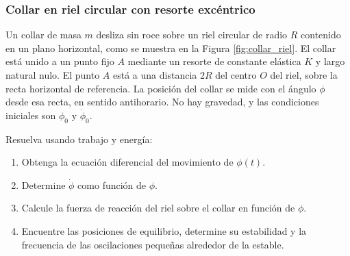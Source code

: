 \subsubsection{Collar en riel circular con resorte excéntrico}

Un collar de masa $m$ desliza sin roce sobre un riel circular de radio $R$ contenido en un plano horizontal, como se muestra en la Figura \ref{fig:collar_riel}. El collar está unido a un punto fijo $A$ mediante un resorte de constante elástica $K$ y largo natural nulo. El punto $A$ está a una distancia $2R$ del centro $O$ del riel, sobre la recta horizontal de referencia. La posición del collar se mide con el ángulo $\phi$ desde esa recta, en sentido antihorario. No hay gravedad, y las condiciones iniciales son $\phi_0$ y $\dot\phi_0$.

Resuelva usando trabajo y energía:
\begin{enumerate}
    \item Obtenga la ecuación diferencial del movimiento de $\phi(t)$.
    \item Determine $\dot\phi$ como función de $\phi$.
    \item Calcule la fuerza de reacción del riel sobre el collar en función de $\phi$.
    \item Encuentre las posiciones de equilibrio, determine su estabilidad y la frecuencia de las oscilaciones pequeñas alrededor de la estable.
\end{enumerate}

